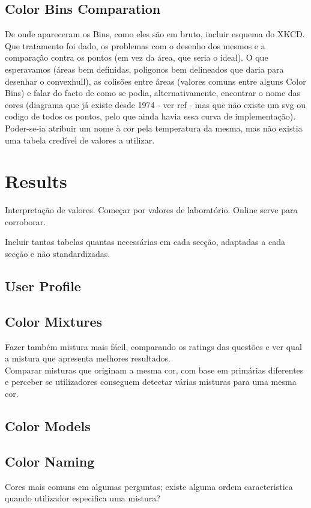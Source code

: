 \subsection{Color Bins Comparation}
\label{subsec:results_preparation}
%
De onde apareceram os Bins, como eles são em bruto, incluir esquema do XKCD. Que tratamento foi dado, os problemas
com o desenho dos mesmos e a comparação contra os pontos (em vez da área, que seria o ideal). O que esperavamos
(áreas bem definidas, poligonos bem delineados que daria para desenhar o convexhull), as colisões entre áreas (valores
comuns entre alguns Color Bins) e falar do facto de como se podia, alternativamente, encontrar o nome das cores (diagrama
que já existe desde 1974 - ver ref - mas que não existe um svg ou codigo de todos os pontos, pelo que ainda havia essa curva
de implementação). Poder-se-ia atribuir um nome à cor pela temperatura da mesma, mas não existia uma tabela credível de valores
a utilizar.
%
\section{Results}
\label{sec:results_results}
%
Interpretação de valores. Começar por valores de laboratório. Online serve para corroborar. \par
Incluir tantas tabelas quantas necessárias em cada secção, adaptadas a cada secção e não standardizadas.
%
\subsection{User Profile}
\label{subsec:results_userprofile}
%
\subsection{Color Mixtures}
\label{subsec:results_colormixtures}
%
Fazer também mistura mais fácil, comparando os ratings das questões e ver qual a mistura que apresenta melhores resultados. \\
Comparar misturas que originam a mesma cor, com base em primárias diferentes e perceber se utilizadores conseguem detectar várias
misturas para uma mesma cor.
%
\subsection{Color Models}
\label{subsec:results_colormodels}
%
\subsection{Color Naming}
\label{subsec:results_namingcolors}
%
Cores mais comuns em algumas perguntas; existe alguma ordem caracteristica quando utilizador especifica uma mistura?
%
